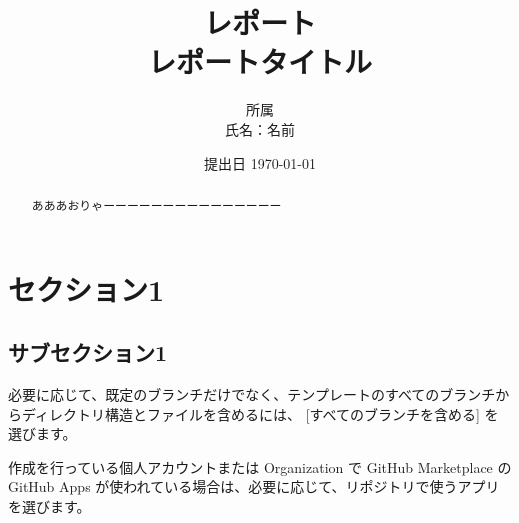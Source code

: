 \documentclass[autodetect-engine,dvipdfmx,ja=standard,a4paper,12pt]{bxjsarticle}
\begin{document}
\title{レポート \\
  レポートタイトル
}
\date{提出日 \today}
\author{所属 \\
  氏名：名前}

\maketitle
\begin{abstract}
  あああおりゃーーーーーーーーーーーーーーー
\end{abstract}

\newpage


\section{セクション1}
\subsection{サブセクション1}

必要に応じて、既定のブランチだけでなく、テンプレートのすべてのブランチからディレクトリ構造とファイルを含めるには、 [すべてのブランチを含める] を選びます。

作成を行っている個人アカウントまたは Organization で GitHub Marketplace の GitHub Apps が使われている場合は、必要に応じて、リポジトリで使うアプリを選びます。

% 
% 
\end{document}
